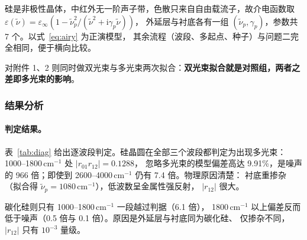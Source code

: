 \documentclass[12pt]{article}
\begin{document}
硅是非极性晶体，中红外无一阶声子带，色散只来自自由载流子，故介电函数取
$\varepsilon(\tilde\nu)=\varepsilon_\infty\left(1-\tilde\nu_p^2/(\tilde\nu^2+\mathrm{i}\gamma_p\tilde\nu)\right)$，
外延层与衬底各有一组 $(\tilde\nu_p,\gamma_p)$，参数共 7 个。以式~\eqref{eq:airy} 为正演模型，
其余流程（波段、多起点、种子）与问题二完全相同，便于横向比较。

对附件 1、2 则同时做双光束与多光束两次拟合：\textbf{双光束拟合就是对照组，两者之差即多光束的影响}。

\subsubsection{结果分析}

\paragraph{判定结果。}
表~\ref{tab:diag} 给出逐波段判定。硅晶圆在全部三个波段都判定为出现多光束：
1000--1800\,cm$^{-1}$ 处 $|r_{01}r_{12}|=0.1288$，
忽略多光束的模型偏差高达 9.91\%，是噪声的
966 倍；即使到 2600--4000\,cm$^{-1}$
仍有 7.4 倍。物理原因清楚：
衬底重掺杂（拟合得 $\tilde\nu_p=1080$\,cm$^{-1}$），低波数呈金属性强反射，
$|r_{12}|$ 很大。

碳化硅则只有 1000--1800\,cm$^{-1}$ 一段越过判据（6.1 倍），
1800\,cm$^{-1}$ 以上偏差反而低于噪声（0.5 倍与
0.1 倍）。原因是外延层与衬底同为碳化硅、
仅掺杂不同，$|r_{12}|$ 只有 $10^{-3}$ 量级。
\end{document}
